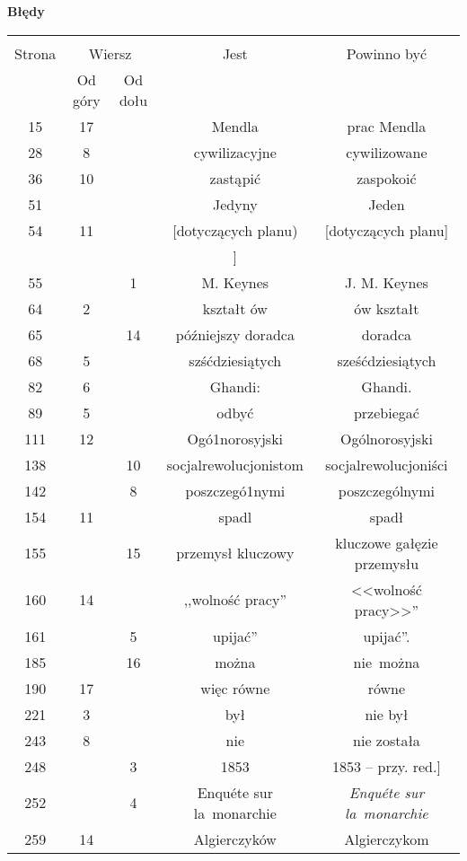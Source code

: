 \documentclass[a4paper,11pt]{article}
\newcommand{\tb}{\textbf}
\newcommand{\Center}[1]{\begin{center} #1 \end{center}}
\newcommand{\CenterTB}[1]{\Center{\tb{#1}}}
\begin{document}
\newpage
\CenterTB{Błędy}
\begin{center}
  \begin{tabular}{|c|c|c|c|c|}
    \hline
    & \multicolumn{2}{c|}{} & & \\
    Strona & \multicolumn{2}{c|}{Wiersz}& Jest & Powinno być \\ \cline{2-3}
    & Od góry & Od dołu & & \\ \hline
    15 & 17 & & Mendla & prac Mendla \\
    28 & 8 & & cywilizacyjne & cywilizowane \\
    36 & 10 & & zastąpić & zaspokoić \\
    51 & & & Jedyny & Jeden \\ %
    54 & 11 & & [dotyczących planu) & [dotyczących planu] \\
    & & & ] & \\
    55 & & 1 & M. Keynes & J. M. Keynes \\
    64 & 2 & & kształt ów & ów kształt \\
    65 & & 14 & późniejszy doradca & doradca \\
    68 & 5 & & szśćdziesiątych & sześćdziesiątych \\
    82 & 6 & & Ghandi: & Ghandi. \\
    89 & 5 & & odbyć & przebiegać \\
    111 & 12 & & Ogó1norosyjski & Ogólnorosyjski \\
    138 & & 10 & socjalrewolucjonistom & socjalrewolucjoniści \\
    142 & & 8 & poszczegó1nymi & poszczególnymi \\
    154 & 11 & & spadl & spadł \\
    155 & & 15 & przemysł kluczowy & kluczowe gałęzie przemysłu \\
    160 & 14 & & ,,wolność pracy'' & <<wolność pracy>>'' \\
    161 & & 5 & upijać'' & upijać''. \\
    185 & & 16 & można & nie~można \\
    190 & 17 & & więc równe & równe \\
    221 & 3 & & był & nie był \\
    243 & 8 & & nie & nie została \\
    248 & & 3 & 1853 & 1853 -- przy. red.] \\
    252 & & 4 & Enqu\'{e}te sur la~monarchie
           & \emph{Enqu\'{e}te sur la~monarchie} \\
    259 & 14 & & Algierczyków & Algierczykom \\

\end{tabular}
\end{center}
\end{document}
